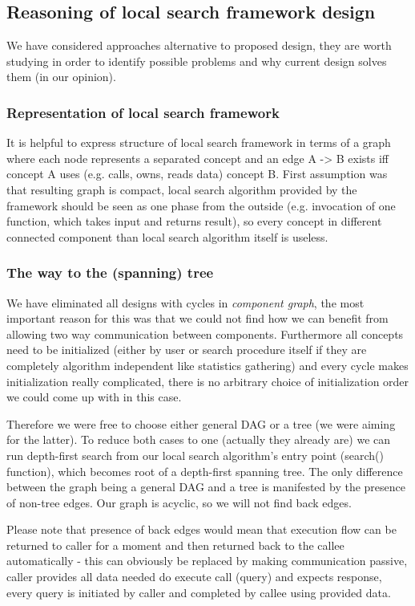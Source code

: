 \subsection{Reasoning of local search framework design}

We have considered approaches alternative to proposed design, they are worth
studying in order to identify possible problems and why current design solves
them (in our opinion).

\subsubsection{Representation of local search framework}
It is helpful to express structure of local search framework in terms of a
graph where each node represents a separated concept and an edge A -> B exists
iff concept A uses (e.g. calls, owns, reads data) concept B. First assumption
was that resulting graph is compact, local search algorithm provided by the
framework should be seen as one phase from the outside (e.g. invocation of one
function, which takes input and returns result), so every concept in different
connected component than local search algorithm itself is useless.

\subsubsection{The way to the (spanning) tree}
We have eliminated all designs with cycles in \emph{component graph}, the most
important reason for this was that we could not find how we can benefit from
allowing two way communication between components. Furthermore all concepts
need to be initialized (either by user or search procedure itself if they are
completely algorithm independent like statistics gathering) and every cycle
makes initialization really complicated, there is no arbitrary choice of
initialization order we could come up with in this case.

Therefore we were free to choose either general DAG or a tree (we were aiming
for the latter). To reduce both cases to one (actually they already are) we can
run depth-first search from our local search algorithm's entry point (search()
function), which becomes root of a depth-first spanning tree. The only
difference between the graph being a general DAG and a tree is manifested by
the presence of non-tree edges. Our graph is acyclic, so we will not find back
edges.

Please note that presence of back edges would mean that execution flow can be
returned to caller for a moment and then returned back to the callee
automatically - this can obviously be replaced by making communication
passive, caller provides all data needed do execute call (query) and expects
response, every query is initiated by caller and completed by callee using
provided data.

